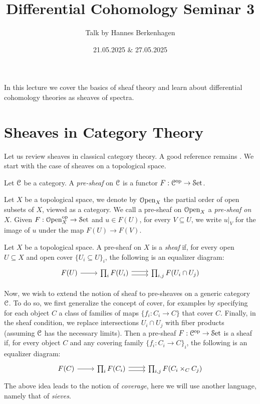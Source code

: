 \documentclass[10pt]{amsart}
\title{Differential Cohomology Seminar 3}
\date{21.05.2025 $\&$ 27.05.2025}
\author{Talk by Hannes Berkenhagen}
\begin{document}
\maketitle

	\maketitle
	
	In this lecture we cover the basics of sheaf theory and learn about differential cohomology theories as sheaves of spectra. 
	
	\section{Sheaves in Category Theory}
	Let us review sheaves in classical category theory. A good reference remains \cite{maclanemoerdijk1994topos}. We start with  the case of sheaves on a topological space. 
	\begin{definition}
		Let $\mathcal{C}$ be a category. A \emph{pre-sheaf} on $\mathcal{C}$ is a functor $F:\mathcal{C}^{\mathrm{op}}\to\mathcal{S}\mathrm{et}$. 
	\end{definition}
	\begin{definition}
		Let $X$ be a topological space, we denote by $\mathcal{O}\mathrm{pen}_X$ the partial order of open subsets of $X$, viewed as a category. We call a pre-sheaf on $\mathcal{O}\mathrm{pen}_X$ a \emph{pre-sheaf on $X$}. Given $F:\mathcal{O}\mathrm{pen}_X^{\mathrm{op}}\to\mathcal{S}\mathrm{et}$ and $u\in F(U)$, for every $V\subseteq U$, we write $u|_V$ for the image of $u$ under the map $F(U)\to F(V)$. 
	\end{definition}	
	\begin{definition}
		Let $X$ be a topological space. A pre-sheaf on $X$ is a \emph{sheaf} if, for every open $U\subseteq X$ and open cover $\{U_i\subseteq U\}_i$, the following is an equalizer diagram:
		\[
		\begin{tikzcd}
			F(U) \arrow[r] & \prod_iF(U_i) \arrow[r, shift left=1] \arrow[r, shift right = 1] &   \prod_{i,j} F(U_i \cap U_j) 
		\end{tikzcd}
		\]
	\end{definition}
	Now, we wish to extend the notion of sheaf to pre-sheaves on a generic category $\mathcal{C}$.
	To do so, we first generalize the concept of cover, for examples by specifying for each object $C$ a class of families of maps $\{f_i:C_i\to C\}$ that {cover} $C$. Finally, in the sheaf condition, we replace intersections $U_i\cap U_j$ with fiber products (assuming $\mathcal{C}$ has the necessary limits). Then a pre-sheaf $F:\mathcal{C}^{\mathrm{op}}\to\mathcal{S}\mathrm{et}$ is a sheaf if, for every object $C$ and any covering family $\{f_i:C_i\to C\}_i$, the following is an equalizer diagram:\[
		\begin{tikzcd}
			F(C) \arrow[r] & \prod_i F(C_i) \arrow[r, shift left=1] \arrow[r, shift right = 1] &   \prod_{i,j} F(C_i \times_C C_j) 
		\end{tikzcd}
		\]
	The above idea leads to the notion of \emph{coverage}, here we will use another language, namely that of \emph{sieves}. 
	
\end{document}
